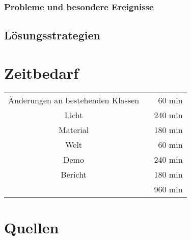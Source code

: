 \documentclass[14pt]{extarticle}
\begin{document}
\subsubsection{Probleme und besondere Ereignisse}
 

\subsection{Lösungsstrategien}



\section{Zeitbedarf}
\begin{center}
\begin{tabular}{cr}
Änderungen an bestehenden Klassen \	&60 min	\\
Licht	  \	&240 min	\\
Material 	\	&180 min	\\
Welt \	&60 min	\\
Demo \	&240 min	\\
Bericht  \		&180 min	 \\
	\hline
	&960 min
\end{tabular}
\end{center}

\section{Quellen}
\end{document}
